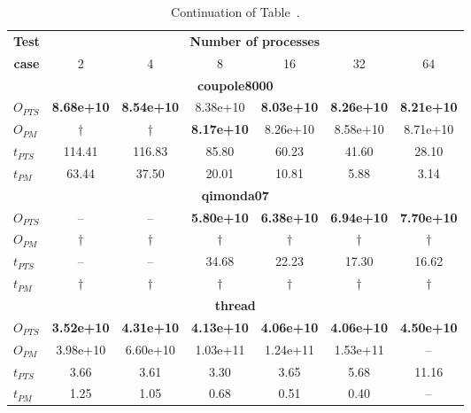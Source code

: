 \documentclass[fleqn,12pt,twoside]{article}
\begin{document}
\begin{table}[hbt]
\begin{center}
  \begin{tabular}{|l||c|c|c|c|c|c|}
    \hline
    \multicolumn{1}{|c||}{{\bf Test}} &
    \multicolumn{6}{c|}{{\bf Number of processes}}\\
    \cline{2-7}
     \multicolumn{1}{|c||}{{\bf case}} & 2 & 4 & 8 & 16 & 32 & 64 \\
    \hline
    \hline
    \multicolumn{7}{|c|}{{\bf coupole8000}} \\
    \hline
    $O_{PTS}$ & \textbf{8.68e+10} & \textbf{8.54e+10} & 8.38e+10 & \textbf{8.03e+10} & \textbf{8.26e+10} & \textbf{8.21e+10} \\
    $O_{PM}$  & $\dag$   & $\dag$   & \textbf{8.17e+10} & 8.26e+10 & 8.58e+10 & 8.71e+10 \\
    $t_{PTS}$ & 114.41   & 116.83   & 85.80    & 60.23    & 41.60    & 28.10    \\
    $t_{PM}$  & 63.44    & 37.50    & 20.01    & 10.81    & 5.88     & 3.14     \\
    \hline
    \multicolumn{7}{|c|}{{\bf qimonda07}} \\
    \hline
    $O_{PTS}$ & -- & -- & \textbf{5.80e+10} & \textbf{6.38e+10} & \textbf{6.94e+10} & \textbf{7.70e+10} \\
    $O_{PM}$  & $\dag$ & $\dag$ & $\dag$ & $\dag$ & $\dag$   & $\dag$  \\
    $t_{PTS}$ & --  & -- & 34.68 & 22.23 & 17.30 & 16.62 \\
    $t_{PM}$  & $\dag$  &$\dag$ & $\dag$ & $\dag$ & $\dag$  & $\dag$  \\
    \hline
\multicolumn{7}{|c|}{{\bf thread}} \\
    \hline
    $O_{PTS}$ & \textbf{3.52e+10} & \textbf{4.31e+10} & \textbf{4.13e+10} & \textbf{4.06e+10} & \textbf{4.06e+10} & \textbf{4.50e+10} \\
    $O_{PM}$  & 3.98e+10 & 6.60e+10 & 1.03e+11 & 1.24e+11 & 1.53e+11 & --       \\
    $t_{PTS}$ & 3.66     & 3.61     & 3.30     & 3.65     & 5.68     & 11.16    \\
    $t_{PM}$  & 1.25     & 1.05     & 0.68     &  0.51    & 0.40     & --       \\
    \hline
  \end{tabular}
\end{center}
\caption{Continuation of Table~\protect{\ref{tabparmetis}}.}
\label{tabparmetisparttwo}
\end{table}
 
\end{document}
